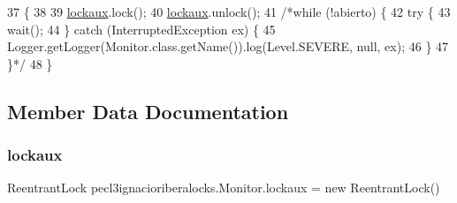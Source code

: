 \begin{DoxyCode}
37                             \{
38         
39         \mbox{\hyperlink{classpecl3ignacioriberalocks_1_1_monitor_acde04bf90a7d9fc0ab9e3362f8c594bf}{lockaux}}.lock();
40         \mbox{\hyperlink{classpecl3ignacioriberalocks_1_1_monitor_acde04bf90a7d9fc0ab9e3362f8c594bf}{lockaux}}.unlock();
41         \textcolor{comment}{/*while (!abierto) \{}
42 \textcolor{comment}{            try \{}
43 \textcolor{comment}{                wait();}
44 \textcolor{comment}{            \} catch (InterruptedException ex) \{}
45 \textcolor{comment}{                Logger.getLogger(Monitor.class.getName()).log(Level.SEVERE, null, ex);}
46 \textcolor{comment}{            \}}
47 \textcolor{comment}{        \}*/}
48     \}
\end{DoxyCode}


\subsection{Member Data Documentation}
\mbox{\label{classpecl3ignacioriberalocks_1_1_monitor_acde04bf90a7d9fc0ab9e3362f8c594bf}} 
\subsubsection{\texorpdfstring{lockaux}{lockaux}}
{\footnotesize\ttfamily Reentrant\+Lock pecl3ignacioriberalocks.\+Monitor.\+lockaux = new Reentrant\+Lock()\hspace{0.3cm}{\ttfamily [private]}}

